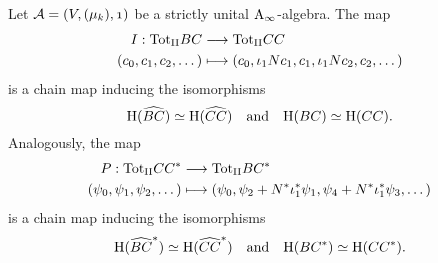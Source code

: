 \documentclass[\MainFolder/Text.tex]{subfiles}
\begin{document}
\begin{Lemma}\label{Lem:LodConCycBi}
Let $\Alg=(V,(\mu_k),\NOne)$ be a strictly unital $\mathrm{A}_\infty$-algebra. The map
\begin{align*}
I: {\mathrm{Tot}_{\mathrm{II}}} BC &\longrightarrow {\mathrm{Tot}_{\mathrm{II}}}CC\\
(c_0, c_1, c_2, \dotsc) &\longmapsto (c_0, \iota_1 N c_1, c_1, \iota_1 N c_2, c_2, \dotsc )
\end{align*}
is a chain map inducing the isomorphisms 
$$\mathrm{H}( \widehat{BC})\simeq \mathrm{H}(\widehat{CC})\quad\text{and}\quad\mathrm{H}(BC)\simeq\mathrm{H}(CC).$$ Analogously, the map 
\begin{align*}
P: {\mathrm{Tot}_{\mathrm{II}}}CC^* &\longrightarrow {\mathrm{Tot}_{\mathrm{II}}} BC^* \\
(\psi_0, \psi_1,\psi_2, \dotsc )&\longmapsto (\psi_0, \psi_2 + N^* \iota_1^* \psi_1, \psi_4 + N^* \iota_1^* \psi_3, \dotsc )
\end{align*}
is a chain map inducing the isomorphisms 
$$\mathrm{H}(\widehat{BC}^*) \simeq \mathrm{H}(\widehat{CC}^*)\quad\text{and}\quad\mathrm{H}(BC^*) \simeq \mathrm{H}(CC^*).$$
\end{Lemma}
\end{document}
